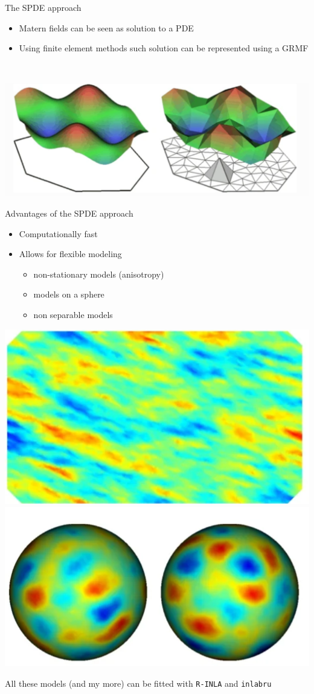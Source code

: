 \documentclass[
  ignorenonframetext,
]{beamer}
\begin{document}
\begin{frame}{The SPDE approach}
\protect\hypertarget{the-spde-approach-1}{}
\begin{itemize}
\item
  Matern fields can be seen as solution to a PDE
\item
  Using finite element methods such solution can be represented using a
  GRMF\\
  \strut \\
\end{itemize}

\begin{center}\includegraphics[width=0.7\linewidth]{graphics/spde} \end{center}
\end{frame}

\begin{frame}[fragile]{Advantages of the SPDE approach}
\protect\hypertarget{advantages-of-the-spde-approach}{}
\begin{itemize}
\item
  Computationally fast
\item
  Allows for flexible modeling

  \begin{itemize}
  \item
    non-stationary models (anisotropy)
  \item
    models on a sphere
  \item
    non separable models
  \end{itemize}
\end{itemize}

\begin{center}\includegraphics[width=0.29\linewidth,height=0.2\textheight]{graphics/fig1} \includegraphics[width=0.29\linewidth,height=0.2\textheight]{graphics/fig2} \end{center}

All these models (and my more) can be fitted with \texttt{R-INLA} and
\texttt{inlabru}
\end{frame}
\end{document}
